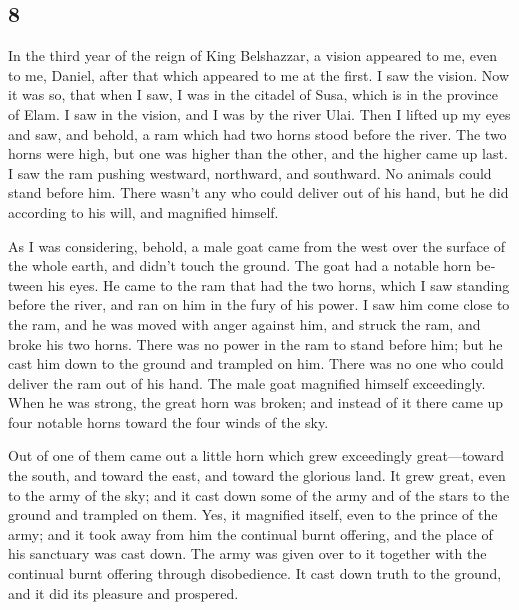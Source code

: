 \begin{paracol}{2}
\begin{otherlanguage}{english}
\hypertarget{section-15}{%
\section{8}\label{section-15}}

 In the third year of the reign of King Belshazzar, a
vision appeared to me, even to me, Daniel, after that which appeared to
me at the first.  I saw the vision. Now it was so, that
when I saw, I was in the citadel of Susa, which is in the province of
Elam. I saw in the vision, and I was by the river Ulai. 
Then I lifted up my eyes and saw, and behold, a ram which had two horns
stood before the river. The two horns were high, but one was higher than
the other, and the higher came up last.  I saw the ram
pushing westward, northward, and southward. No animals could stand
before him. There wasn't any who could deliver out of his hand, but he
did according to his will, and magnified himself.

 As I was considering, behold, a male goat came from the
west over the surface of the whole earth, and didn't touch the ground.
The goat had a notable horn between his eyes.  He came to
the ram that had the two horns, which I saw standing before the river,
and ran on him in the fury of his power.  I saw him come
close to the ram, and he was moved with anger against him, and struck
the ram, and broke his two horns. There was no power in the ram to stand
before him; but he cast him down to the ground and trampled on him.
There was no one who could deliver the ram out of his hand.
 The male goat magnified himself exceedingly. When he was
strong, the great horn was broken; and instead of it there came up four
notable horns toward the four winds of the sky.

 Out of one of them came out a little horn which grew
exceedingly great---toward the south, and toward the east, and toward
the glorious land.  It grew great, even to the army of
the sky; and it cast down some of the army and of the stars to the
ground and trampled on them.  Yes, it magnified itself,
even to the prince of the army; and it took away from him the continual
burnt offering, and the place of his sanctuary was cast down.
 The army was given over to it together with the
continual burnt offering through disobedience. It cast down truth to the
ground, and it did its pleasure and prospered.


\end{otherlanguage}
\end{paracol}
